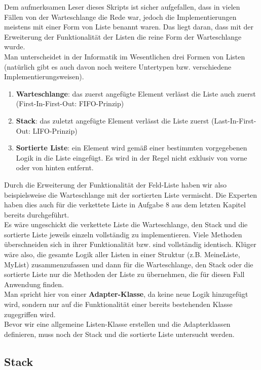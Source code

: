 \documentclass{article}
\begin{document}
Dem aufmerksamen Leser dieses Skripts ist sicher aufgefallen, dass in vielen Fällen von der Warteschlange die Rede war, jedoch die Implementierungen meistens mit einer Form von Liste benannt waren. Das liegt daran, dass mit der Erweiterung der Funktionalität der Listen die reine Form der Warteschlange  wurde. \\ 
Man unterscheidet in der Informatik im Wesentlichen drei Formen von Listen (natürlich gibt es auch davon noch weitere Untertypen bzw. verschiedene Implementierungsweisen).
\begin{enumerate}
    \item \textbf{Warteschlange}: das zuerst angefügte Element verlässt die Liste auch zuerst (First-In-First-Out: FIFO-Prinzip)
    \item \textbf{Stack}: das zuletzt angefügte Element verlässt die Liste zuerst (Last-In-First-Out: LIFO-Prinzip)
    \item \textbf{Sortierte Liste}: ein Element wird gemäß einer bestimmten vorgegebenen Logik in die Liste eingefügt. Es wird in der Regel nicht exklusiv von vorne oder von hinten entfernt.
\end{enumerate}
Durch die Erweiterung der Funktionalität der Feld-Liste haben wir also beispielsweise die Warteschlange mit der sortierten Liste vermischt. Die Experten haben dies auch für die verkettete Liste in Aufgabe 8 aus dem letzten Kapitel bereits durchgeführt. \\
Es wäre ungeschickt die verkettete Liste die Warteschlange, den Stack und die sortierte Liste jeweils einzeln vollständig zu implementieren. Viele Methoden überschneiden sich in ihrer Funktionalität bzw. sind vollständig identisch. Klüger wäre also, die gesamte Logik aller Listen in einer Struktur (z.B. MeineListe, MyList) zusammenzufassen und dann für die Warteschlange, den Stack oder die sortierte Liste nur die Methoden der Liste zu übernehmen, die für diesen Fall Anwendung finden. \\
Man spricht hier von einer \textbf{Adapter-Klasse}, da keine neue Logik hinzugefügt wird, sondern nur auf die Funktionalität einer bereits bestehenden Klasse zugegriffen wird. \\
\vspace{2mm}
Bevor wir eine allgemeine Listen-Klasse erstellen und die Adapterklassen definieren, muss noch der Stack und die sortierte Liste untersucht werden.

\subsection{Stack}
\end{document}
